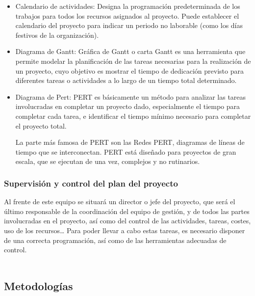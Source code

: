 \documentclass[12pt,twoside]{article}
\begin{document}
\begin{itemize}
    \item Calendario de actividades: Designa la programación predeterminada de los 
    trabajos para todos los recursos asignados al proyecto. Puede establecer el 
    calendario del proyecto para indicar un periodo no laborable (como los días 
    festivos de la organización).
    \item Diagrama de Gantt: Gráfica de Gantt o carta Gantt es una herramienta que 
    permite modelar la planificación de las tareas necesarias para la realización de 
    un proyecto, cuyo objetivo es mostrar el tiempo de dedicación previsto para 
    diferentes tareas o actividades a lo largo de un tiempo total determinado. 
    \item Diagrama de Pert: PERT es básicamente un método para analizar las tareas 
    involucradas en completar un proyecto dado, especialmente el tiempo para completar 
    cada tarea, e identificar el tiempo mínimo necesario para completar el proyecto 
    total.
    
    La parte más famosa de PERT son las Redes PERT, diagramas de líneas de tiempo que 
    se interconectan. PERT está diseñado para proyectos de gran escala, que se 
    ejecutan de una vez, complejos y no rutinarios.
\end{itemize} 


\subsubsection{Supervisión y control del plan del proyecto}
Al frente de este equipo se situará un director o jefe del proyecto, que será el 
último responsable de la coordinación del equipo de gestión, y de todos las 
partes involucradas en el proyecto, así como del control de las actividades, tareas, 
costes, uso de los recursos… Para poder llevar a cabo estas tareas, es necesario
disponer de una correcta programación, así como de las herramientas adecuadas de 
control.\\ \\
\subsection{Metodolog\'ias}
\end{document}
